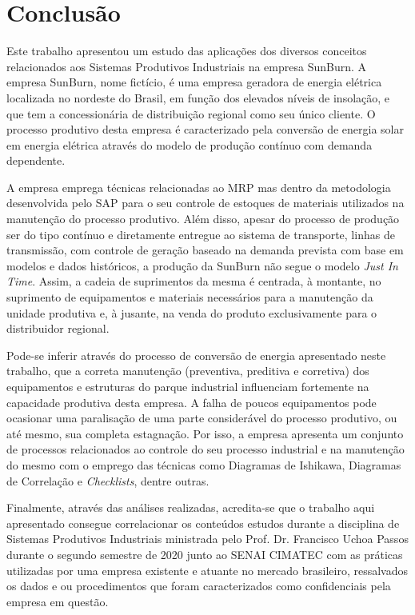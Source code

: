 \chapter{Conclusão}
\label{chap:conclusao}

Este trabalho apresentou um estudo das aplicações dos diversos conceitos relacionados aos Sistemas Produtivos Industriais na empresa SunBurn. A empresa SunBurn, nome fictício, é uma empresa geradora de energia elétrica localizada no nordeste do Brasil, em função dos elevados níveis de insolação, e que tem a concessionária de distribuição regional como seu único cliente. O processo produtivo desta empresa é caracterizado pela conversão de energia solar em energia elétrica através do modelo de produção contínuo com demanda dependente.

A empresa emprega técnicas relacionadas ao \ac{MRP} mas dentro da metodologia desenvolvida pelo \ac{SAP} para o seu controle de estoques de materiais utilizados na manutenção do processo produtivo. Além disso, apesar do processo de produção ser do tipo contínuo e diretamente entregue ao sistema de transporte, linhas de transmissão, com controle de geração baseado na demanda prevista com base em modelos e dados históricos, a produção da SunBurn não segue o modelo \textit{Just In Time}. Assim, a cadeia de suprimentos da mesma é centrada, à montante, no suprimento de equipamentos e materiais necessários para a manutenção da unidade produtiva e, à jusante, na venda do produto exclusivamente para o distribuidor regional.

Pode-se inferir através do processo de conversão de energia apresentado neste trabalho, que a correta manutenção (preventiva, preditiva e corretiva) dos equipamentos e estruturas do parque industrial influenciam fortemente na capacidade produtiva desta empresa. A falha de poucos equipamentos pode ocasionar uma paralisação de uma parte considerável do processo produtivo, ou até mesmo, sua completa estagnação. Por isso, a empresa apresenta um conjunto de processos relacionados ao controle do seu processo industrial e na manutenção do mesmo com o emprego das técnicas como Diagramas de Ishikawa, Diagramas de Correlação e \textit{Checklists}, dentre outras.

Finalmente, através das análises realizadas, acredita-se que o trabalho aqui apresentado consegue correlacionar os conteúdos estudos durante a disciplina de Sistemas Produtivos Industriais ministrada pelo Prof. Dr. Francisco Uchoa Passos durante o segundo semestre de 2020 junto ao SENAI CIMATEC com as práticas utilizadas por uma empresa existente e atuante no mercado brasileiro, ressalvados os dados e ou procedimentos que foram caracterizados como confidenciais pela empresa em questão.